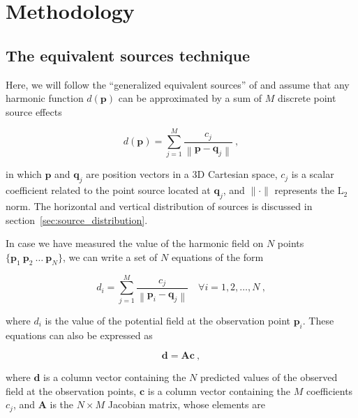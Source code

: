 \documentclass[twocolumn]{article}
\begin{document}

\section{Methodology}

\subsection{The equivalent sources technique}

Here, we will follow the ``generalized equivalent sources'' of
\citet{cordell1992} and assume that any harmonic function $d(\mathbf{p})$ can
be approximated by a sum of $M$ discrete point source effects

\begin{equation}
    d(\mathbf{p})
    =
    \sum\limits_{j=1}^{M} \frac{c_j}{\left\lVert \mathbf{p} - \mathbf{q}_j
    \right\rVert} \ ,
    \label{eq:eql-forward}
\end{equation}

\noindent in which
$\mathbf{p}$ and $\mathbf{q}_j$ are position vectors in a 3D Cartesian space,
$c_j$ is a scalar coefficient related to the point source located at
$\mathbf{q}_j$,
and $\lVert \cdot \rVert$ represents the $\text{L}_2$ norm.
The horizontal and vertical distribution of sources is discussed in section~\ref{sec:source_distribution}.

In case we have measured the value of the harmonic field on $N$ points
$\{\mathbf{p}_1\ \mathbf{p}_2\ \ldots\ \mathbf{p}_N\}$,
we can write a set of $N$ equations of the form

\begin{equation}
    d_i
    =
    \sum\limits_{j=1}^{M} \frac{c_j}{\left\lVert \mathbf{p}_i - \mathbf{q}_j
    \right\rVert}
    \quad \forall i=1,2,\ldots,N
    \ ,
    \label{eq:forward-sum}
\end{equation}

\noindent where $d_i$ is the value of the potential field at the observation point $\mathbf{p}_i$.
These equations can also be expressed as

\begin{equation}
    \mathbf{d} = \mathbf{A} \mathbf{c} \ ,
    \label{eq:linear-problem}
\end{equation}

\noindent where $\mathbf{d}$ is a column vector containing the $N$ predicted
values of the observed field at the observation points,
$\mathbf{c}$ is a column vector containing the $M$ coefficients $c_j$,
and $\mathbf{A}$ is the $N \times M$ Jacobian matrix,
whose elements are
\end{document}
